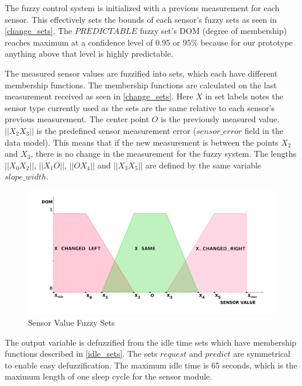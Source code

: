 The fuzzy control system is initialized with a previous measurement for each sensor. This effectively sets the bounds of each sensor's fuzzy sets as seen in \autoref{change_sets}. The $PREDICTABLE$ fuzzy set's DOM (degree of membership) reaches maximum at a confidence level of 0.95 or 95\% because for our prototype anything above that level is highly predictable. 

The measured sensor values are fuzzified into sets, which each have different membership functions. The membership functions are calculated on the last measurement received as seen in \autoref{change_sets}. Here $X$ in set labels notes the sensor type currently used as the sets are the same relative to each sensor's previous measurement. The center point $O$ is the previously measured value. $||X_2X_3||$ is the predefined sensor measurement error  ($sensor\_error$ field in the data model). This means that if the new measurement is between the points $X_2$ and $X_3$, there is no change in the measurement for the fuzzy system. The lengths $||X_0X_2||$, $||X_1O||$, $||OX_4||$ and $||X_3X_5||$ are defined by the same variable $slope\_width$. 

\begin{figure}[h!]
\centering
\includegraphics[scale=0.55]{4/figures/change_sets.pdf}
\caption{Sensor Value Fuzzy Sets}
\label{change_sets}
\end{figure}

The output variable is defuzzified from the idle time sets which have membership functions described in \autoref{idle_sets}. The sets $request$ and $predict$ are symmetrical to enable easy defuzzification. The maximum idle time is 65 seconds, which is the maximum length of one sleep cycle for the sensor module. 

